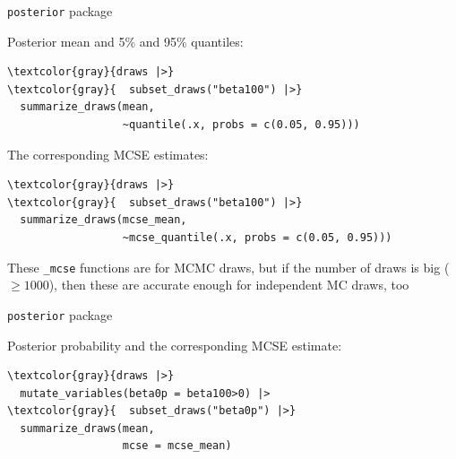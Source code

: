\documentclass[english,t]{beamer}
\begin{document}
\begin{frame}[fragile]{\texttt{posterior} package}

  Posterior mean and 5\% and 95\% quantiles:
\vspace{-.5\baselineskip}
  {\small
\begin{Verbatim}[commandchars=\\\{\}]
\textcolor{gray}{draws |>}
\textcolor{gray}{  subset_draws("beta100") |>}
  summarize_draws(mean,
                  ~quantile(.x, probs = c(0.05, 0.95)))
\end{Verbatim}
    }

\pause
The corresponding MCSE estimates:
\vspace{-.5\baselineskip}
  {\small
\begin{Verbatim}[commandchars=\\\{\}]
\textcolor{gray}{draws |>}
\textcolor{gray}{  subset_draws("beta100") |>}
  summarize_draws(mcse_mean,
                  ~mcse_quantile(.x, probs = c(0.05, 0.95)))
\end{Verbatim}
  }

  \pause
  These \texttt{\_mcse} functions are for MCMC draws, but if
  the number of draws is big ($\geq 1000$), then these are accurate
  enough for independent MC draws, too
  
\end{frame}

\begin{frame}[fragile]{\texttt{posterior} package}

  Posterior probability and the corresponding MCSE estimate:
\vspace{-.5\baselineskip}
  {\small
\begin{Verbatim}[commandchars=\\\{\}]
\textcolor{gray}{draws |>}
  mutate_variables(beta0p = beta100>0) |>
\textcolor{gray}{  subset_draws("beta0p") |>}
  summarize_draws(mean,
                  mcse = mcse_mean)
\end{Verbatim}
    }

  
\end{frame}
\end{document}
